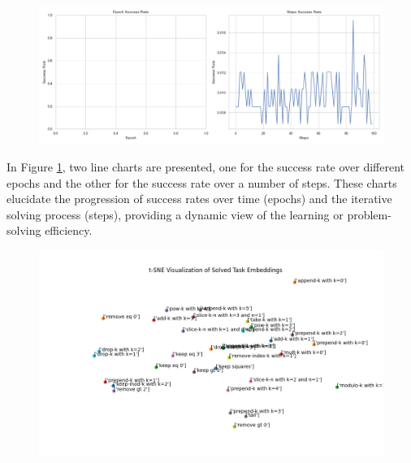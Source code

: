 \begin{figure}
    \centering
    \includegraphics[width=\textwidth]{../img/plot_epoch_steps_analysis.png}
    \caption{}
    \label{fig:epoch_steps_analysis}
\end{figure}

In Figure \ref{fig:epoch_steps_analysis}, two line charts are presented, one for the success rate over different epochs and the other for the success rate over a number of steps. These charts elucidate the progression of success rates over time (epochs) and the iterative solving process (steps), providing a dynamic view of the learning or problem-solving efficiency.

\begin{figure}
    \centering
    \includegraphics[width=\textwidth]{../img/task_embeddings.png}
    \caption{}
    \label{}
\end{figure}




    







\section{}

